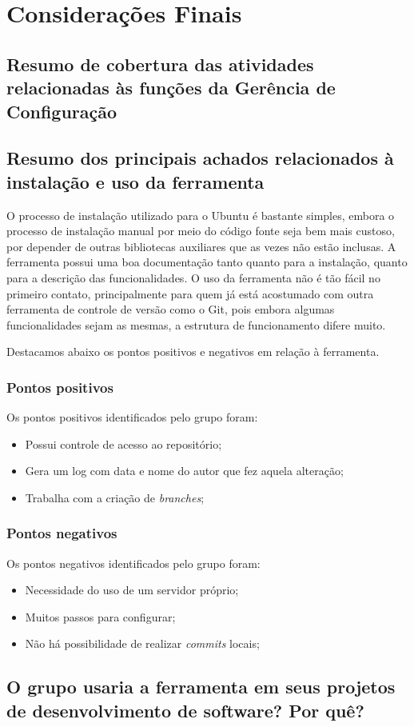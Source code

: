 \chapter[Considerações Finais]{Considerações Finais}

\section{Resumo de cobertura das atividades relacionadas às funções da Gerência de Configuração}
\section{Resumo dos principais achados relacionados à instalação e uso da ferramenta}

	O processo de instalação utilizado para o Ubuntu é bastante simples, embora o processo de instalação manual por meio do 
	código fonte seja bem mais custoso, por depender de outras bibliotecas auxiliares que as vezes não estão inclusas.
	A ferramenta possui uma boa documentação tanto quanto para a instalação, quanto para a descrição das funcionalidades.
	O uso da ferramenta não é tão fácil no primeiro contato, principalmente para quem já está acostumado com outra ferramenta 
	de controle de versão como o Git, pois embora algumas funcionalidades sejam as mesmas, a estrutura de funcionamento difere muito.

	Destacamos abaixo os pontos positivos e negativos em relação à ferramenta.

	\subsection{Pontos positivos}

			Os pontos positivos identificados pelo grupo foram:

			\begin{itemize}
				\item Possui controle de acesso ao repositório;
				\item Gera um log com data e nome do autor que fez aquela alteração;
				\item Trabalha com a criação de \textit{branches};
			\end{itemize}


	\subsection{Pontos negativos}

			Os pontos negativos identificados pelo grupo foram:

			\begin{itemize}
				\item Necessidade do uso de um servidor próprio;
				\item Muitos passos para configurar;
				\item Não há possibilidade de realizar \textit{commits} locais;
			\end{itemize}

\section{O grupo usaria a ferramenta em seus projetos de desenvolvimento de software? Por quê?}

